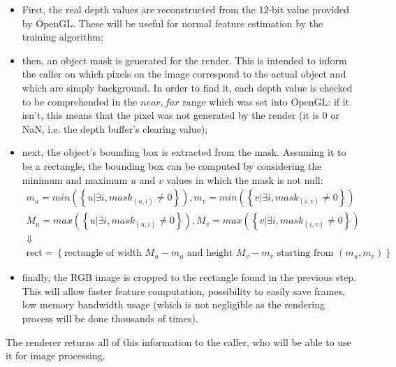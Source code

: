 \begin{itemize}
  \item{
    First, the real depth values are reconstructed from the 12-bit value
    provided by OpenGL. These will be useful for normal feature estimation by
  the training algorithm;}
  \item{then, an object mask is generated for the render. This is intended to inform
the caller on which pixels on the image correspond to the actual object and
which are simply background. In order to find it, each depth value is checked to
be comprehended in the $near,far$ range which was set into OpenGL: if it isn't,
this means that the pixel was not generated by the render (it is 0 or NaN, i.e.
the depth buffer's clearing value);}
  \item{next, the object's bounding box is extracted from the mask. Assuming it
to be a rectangle, the bounding box can be computed by considering the minimum
and maximum $u$ and $v$ values in which the mask is not null:
\[
  \begin{array}{c}
    m_u=min\left(\left\{u | \exists i, mask_{(u,i)}\neq 0\right\}\right),
    m_v=min\left(\left\{v | \exists i, mask_{(i,v)}\neq 0\right\}\right) \\
    M_u=max\left(\left\{u | \exists i, mask_{(u,i)}\neq 0\right\}\right),
    M_v=max\left(\left\{v | \exists i, mask_{(i,v)}\neq 0\right\}\right) \\
    \Downarrow \\
    \text{rect}=\left\{\text{rectangle of width } M_u-m_u \text{ and height } M_v-m_v
    \text{ starting from } (m_u,m_v)\right\}
  \end{array}
\]
}
\item{finally, the RGB image is cropped to the rectangle found in the previous
    step. This will allow faster feature computation, possibility to easily save
    frames, low memory bandwidth usage (which is not negligible as the rendering
  process will be done thousands of times).}
\end{itemize}

The renderer returns all of this information to the caller, who will be able to
use it for image processing.
